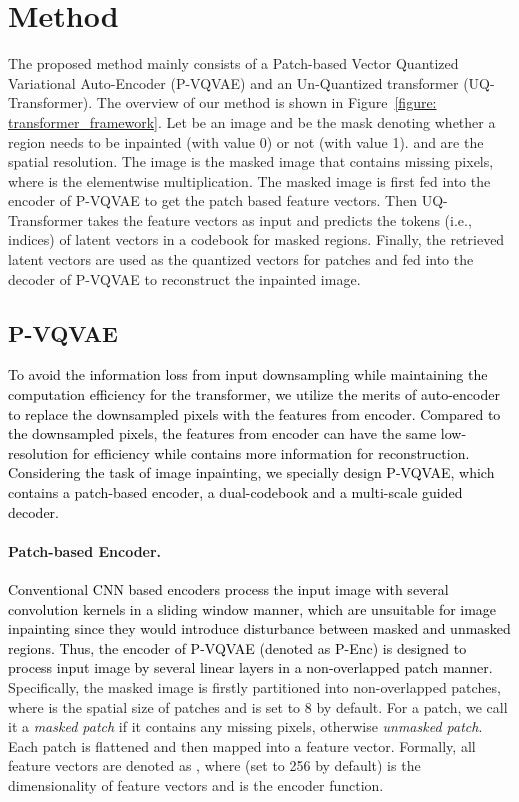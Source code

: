 \documentclass[10pt,twocolumn,letterpaper]{article}
\newcommand{\Fref}[1]{Figure~\ref{#1}}
\newcommand{\qchu}[1]{\textcolor{black}{#1}}
\begin{document}
\section{Method}
\label{sec: method}
The proposed method mainly consists of a Patch-based Vector Quantized Variational Auto-Encoder (P-VQVAE) and an Un-Quantized transformer (UQ-Transformer). The overview of our method is shown in \Fref{figure: transformer_framework}. Let  be an image and  be the mask denoting whether a region needs to be inpainted (with value 0) or not (with value 1).  and  are the spatial resolution. The image  is the masked image that contains missing pixels, where  is the elementwise multiplication. 
The masked image  is first fed into the encoder of P-VQVAE to get the patch based feature vectors. Then UQ-Transformer takes the feature vectors as input and predicts the tokens (i.e., indices) of latent vectors in a codebook for masked regions. 
Finally, the retrieved latent vectors are used as the quantized vectors for patches
and fed into the decoder of P-VQVAE to reconstruct the inpainted image.

\subsection{P-VQVAE}
\label{sec: p_vqvae}
\qchu{To avoid the information loss from input downsampling while maintaining the computation efficiency for the transformer, we utilize the merits of auto-encoder to replace the downsampled pixels with the features from encoder. Compared to the downsampled pixels, the features from encoder can have the same low-resolution  for efficiency while contains more information for reconstruction. Considering the task of image inpainting, we specially design P-VQVAE, which contains a patch-based encoder, a dual-codebook and a multi-scale guided decoder.}

\paragraph{Patch-based Encoder.}
\label{sec: p_enc}
\qchu{Conventional CNN based encoders process the input image with several convolution kernels in a sliding window manner, which are unsuitable for image inpainting since they would introduce disturbance between masked and unmasked regions. Thus, the encoder of P-VQVAE (denoted as P-Enc) is designed to process input image by several linear layers in a non-overlapped patch manner.}
Specifically, the masked image  is firstly partitioned into  non-overlapped patches, where  is the spatial size of patches and is set to 8 by default. For a patch, we call it a \emph{masked patch} if it contains any missing pixels, otherwise \emph{unmasked patch}.
Each patch is flattened and then mapped into a feature vector.
Formally, all feature vectors are denoted as , where  (set to 256 by default) is the dimensionality of feature vectors and  is the encoder function. 
\end{document}

